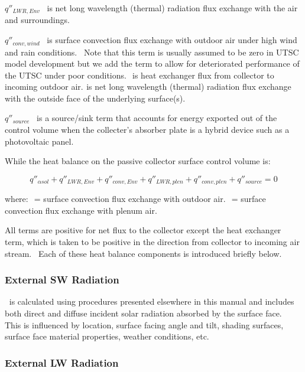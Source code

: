 \({q''_{LWR,Env}}\) ~is net long wavelength (thermal) radiation flux exchange with the air and surroundings.

\({q''_{conv,wind}}\) ~is surface convection flux exchange with outdoor air under high wind and rain conditions.~ Note that this term is usually assumed to be zero in UTSC model development but we add the term to allow for deteriorated performance of the UTSC under poor conditions. \(_{ }\) is heat exchanger flux from collector to incoming outdoor air. \(_{ }\)is net long wavelength (thermal) radiation flux exchange with the outside face of the underlying surface(s).

\({q''_{source}}\) ~is a source/sink term that accounts for energy exported out of the control volume when the collecter's absorber plate is a hybrid device such as a photovoltaic panel.

While the heat balance on the passive collector surface control volume is:

\begin{equation}
{q''_{\alpha sol}} + {q''_{LWR,Env}} + {q''_{conv,Env}} + {q''_{LWR,plen}} + {q''_{conv,plen}} + {q''_{source}} = 0
\end{equation}

where: \(_{ }\) = surface convection flux exchange with outdoor air. \(_{ }\) = surface convection flux exchange with plenum air.

All terms are positive for net flux to the collector except the heat exchanger term, which is taken to be positive in the direction from collector to incoming air stream.~ Each of these heat balance components is introduced briefly below.

\subsubsection{External SW Radiation}\label{external-sw-radiation-000}

\(_{ }\)~is calculated using procedures presented elsewhere in this manual and includes both direct and diffuse incident solar radiation absorbed by the surface face.~ This is influenced by location, surface facing angle and tilt, shading surfaces, surface face material properties, weather conditions, etc.

\subsubsection{External LW Radiation}\label{external-lw-radiation-000}

